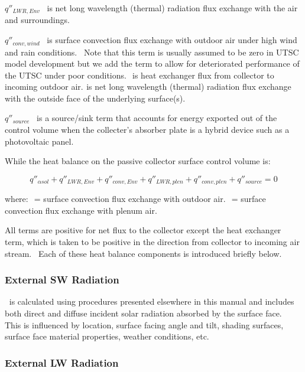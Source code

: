 \({q''_{LWR,Env}}\) ~is net long wavelength (thermal) radiation flux exchange with the air and surroundings.

\({q''_{conv,wind}}\) ~is surface convection flux exchange with outdoor air under high wind and rain conditions.~ Note that this term is usually assumed to be zero in UTSC model development but we add the term to allow for deteriorated performance of the UTSC under poor conditions. \(_{ }\) is heat exchanger flux from collector to incoming outdoor air. \(_{ }\)is net long wavelength (thermal) radiation flux exchange with the outside face of the underlying surface(s).

\({q''_{source}}\) ~is a source/sink term that accounts for energy exported out of the control volume when the collecter's absorber plate is a hybrid device such as a photovoltaic panel.

While the heat balance on the passive collector surface control volume is:

\begin{equation}
{q''_{\alpha sol}} + {q''_{LWR,Env}} + {q''_{conv,Env}} + {q''_{LWR,plen}} + {q''_{conv,plen}} + {q''_{source}} = 0
\end{equation}

where: \(_{ }\) = surface convection flux exchange with outdoor air. \(_{ }\) = surface convection flux exchange with plenum air.

All terms are positive for net flux to the collector except the heat exchanger term, which is taken to be positive in the direction from collector to incoming air stream.~ Each of these heat balance components is introduced briefly below.

\subsubsection{External SW Radiation}\label{external-sw-radiation-000}

\(_{ }\)~is calculated using procedures presented elsewhere in this manual and includes both direct and diffuse incident solar radiation absorbed by the surface face.~ This is influenced by location, surface facing angle and tilt, shading surfaces, surface face material properties, weather conditions, etc.

\subsubsection{External LW Radiation}\label{external-lw-radiation-000}

